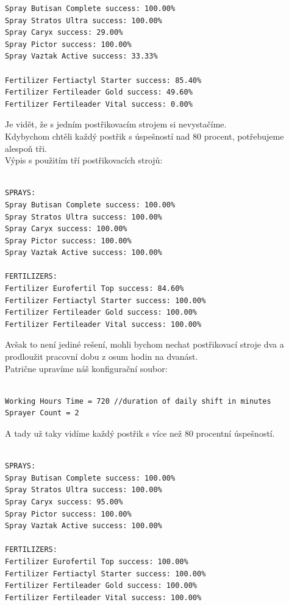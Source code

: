 \documentclass[11pt,a4paper,titlepage]{article}
\begin{document}
\begin{lstlisting}
Spray Butisan Complete success: 100.00%
Spray Stratos Ultra success: 100.00%
Spray Caryx success: 29.00%
Spray Pictor success: 100.00%
Spray Vaztak Active success: 33.33%

Fertilizer Fertiactyl Starter success: 85.40%
Fertilizer Fertileader Gold success: 49.60%
Fertilizer Fertileader Vital success: 0.00%
\end{lstlisting}
\vspace{45px}
Je vidět, že s jedním postřikovacím strojem si nevystačíme.\\
Kdybychom chtěli každý postřik s úspešností nad 80 procent, potřebujeme alespoň tři. \\
Výpis s použitím tří postřikovacích strojů: \\ \\
\begin{lstlisting}
SPRAYS: 
Spray Butisan Complete success: 100.00%
Spray Stratos Ultra success: 100.00%
Spray Caryx success: 100.00%
Spray Pictor success: 100.00%
Spray Vaztak Active success: 100.00%

FERTILIZERS: 
Fertilizer Eurofertil Top success: 84.60%
Fertilizer Fertiactyl Starter success: 100.00%
Fertilizer Fertileader Gold success: 100.00%
Fertilizer Fertileader Vital success: 100.00%
\end{lstlisting}
\vspace{45px}
Avšak to není jediné rešení, mohli bychom nechat postřikovací stroje dva a prodloužit pracovní dobu z osum hodin na dvanást.\\
Patrične upravíme náš konfigurační soubor: \\ \\
\begin{lstlisting}
Working Hours Time = 720 //duration of daily shift in minutes
Sprayer Count = 2
\end{lstlisting}
\vspace{45px}
A tady už taky vidíme každý postřik s více než 80 procentní úspešností. \\ \\
\begin{lstlisting}
SPRAYS: 
Spray Butisan Complete success: 100.00%
Spray Stratos Ultra success: 100.00%
Spray Caryx success: 95.00%
Spray Pictor success: 100.00%
Spray Vaztak Active success: 100.00%

FERTILIZERS: 
Fertilizer Eurofertil Top success: 100.00%
Fertilizer Fertiactyl Starter success: 100.00%
Fertilizer Fertileader Gold success: 100.00%
Fertilizer Fertileader Vital success: 100.00%
\end{lstlisting}
\end{document}

